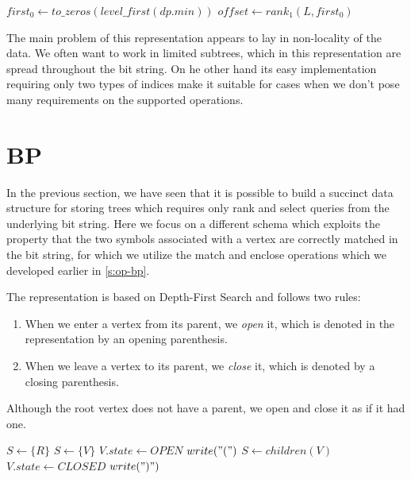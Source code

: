\begin{algorithmic}
		\State {}
	\Else
		\State $first_0 \gets to\_zeros(level\_first(dp.min))$
		\State $offset \gets rank_1(L, first_0)$
		\State {}
	\EndIf
\EndFunction
\end{algorithmic}

\bigskip

The main problem of this representation appears to lay in non-locality of the data.
We often want to work in limited subtrees, which in this representation are spread throughout the bit string.
On he other hand its easy implementation requiring only two types of indices make it suitable for cases when we don't pose many requirements on the supported operations.

\section{BP}

In the previous section, we have seen that it is possible to build a succinct data structure for storing trees which requires only rank and select queries from the underlying bit string.
Here we focus on a different schema which exploits the property that the two symbols associated with a vertex are correctly matched in the bit string, for which we utilize the match and enclose operations which we developed earlier in \ref{s:op-bp}.

The representation is based on Depth-First Search and follows two rules:
\begin{enumerate}
	\item When we enter a vertex from its parent, we \emph{open} it, which is denoted in the representation by an opening parenthesis.
	\item When we leave a vertex to its parent, we \emph{close} it, which is denoted by a closing parenthesis.
\end{enumerate}
Although the root vertex does not have a parent, we open and close it as if it had one.

\begin{algorithmic}
	\State $S \gets \{R\}$ 
		 
			\State $ S \gets \{V\}$ 
			\State $V.state \gets OPEN$
			\State $write("(")$
			\State $ S \gets children(V)$
		 
			\State $V.state \gets CLOSED$
			\State $write(")")$
		\EndIf
	\EndWhile
\EndFunction
\end{algorithmic}

